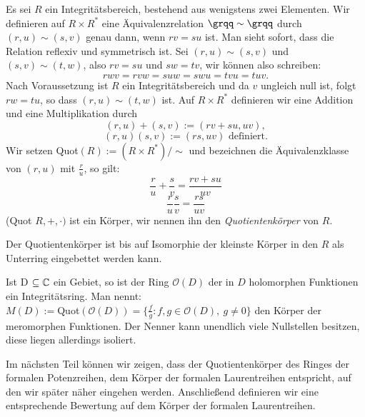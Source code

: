 \begin{satz}\label{quotkoerper} %
Es sei $R$ ein Integritätsbereich, bestehend aus wenigstens zwei Elementen. Wir definieren auf $R\times R^*$ eine Äquivalenzrelation $\grqq\sim\grqq$ durch $\left(r,u\right) \sim \left(s, v\right)$ genau dann, wenn $rv = su$ ist. Man sieht sofort, dass die Relation reflexiv und symmetrisch ist. Sei $\left(r,u\right) \sim \left(s, v\right)$ und $ \left(s, v\right) \sim \left(t, w\right) $, also $rv = su$ und $sw = tv$, wir können also schreiben: \\
\[rwv = rvw = suw = swu = tvu = tuv.\]
Nach Voraussetzung ist $R$ ein Integritätsbereich und da $v$ ungleich null ist, folgt $rw = tu$, so dass $\left(r,u \right) \sim \left(t, w\right)$ ist. Auf $R\times R^*$ definieren wir eine Addition und eine Multiplikation durch 
\[\left(r,u\right)+ \left(s,v\right) := \left(rv + su, uv\right),\]
\[\left(r,u\right)\left(s,v\right) := \left(rs, uv\right)\text{ definiert.}\] %
Wir setzen Quot$(R) := (R\times R^*)/\sim$ und bezeichnen die Äquivalenzklasse von $(r,u) $ mit $\frac{r}{u}$, so gilt: 
\[\frac{r}{u} + \frac{s}{v} = \frac{rv + su}{uv}\]
\[\frac{r}{u}\frac{s}{v} = \frac{rs}{uv}\]
(Quot $R, +, \cdot)$ ist ein Körper, wir nennen ihn den \textit{Quotientenkörper} von $R$.
\end{satz}
Der Quotientenkörper ist bis auf Isomorphie der kleinste Körper in den $R$ als Unterring eingebettet werden kann.
%
%
\begin{bsp}
Ist D $\subseteq \mathbb{C}$ ein Gebiet, so ist der Ring $ \mathcal{O} (D) $ der in $D$ holomorphen Funktionen ein Integritätsring. Man nennt: \\
$ M \left(D\right) := $Quot$\left( \mathcal{O} \left( D \right)\right) = \lbrace \frac{f}{g}: f,g \in \mathcal{O} (D), ~g \neq 0\rbrace$ den Körper der meromorphen Funktionen. Der Nenner kann unendlich viele Nullstellen besitzen, diese liegen allerdings isoliert. 
\end{bsp}
%

Im nächsten Teil können wir zeigen, dass der Quotientenkörper des Ringes der formalen Potenzreihen, dem Körper der formalen Laurentreihen entspricht, auf den wir später näher eingehen werden. Anschließend definieren wir eine entsprechende Bewertung auf dem Körper der formalen Laurentreihen.


